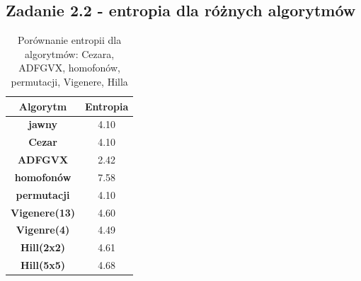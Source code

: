 \documentclass{article}
\begin{document}
\subsection*{Zadanie 2.2 - entropia dla różnych algorytmów}
\begin{table}[H]
    \centering
    \begin{tabular}{|c|c|}
    \hline
    \textbf{Algorytm}     & \textbf{Entropia} \\ \hline
    \textbf{jawny}        & 4.10              \\ \hline
    \textbf{Cezar}        & 4.10              \\ \hline
    \textbf{ADFGVX}       & 2.42              \\ \hline
    \textbf{homofonów}    & 7.58              \\ \hline
    \textbf{permutacji}   & 4.10              \\ \hline
    \textbf{Vigenere(13)} & 4.60              \\ \hline
    \textbf{Vigenre(4)}   & 4.49              \\ \hline
    \textbf{Hill(2x2)}    & 4.61              \\ \hline
    \textbf{Hill(5x5)}    & 4.68              \\ \hline
    \end{tabular}
    \caption{Porównanie entropii dla algorytmów: Cezara, ADFGVX, homofonów, permutacji, Vigenere, Hilla}
\end{table}
\end{document}

